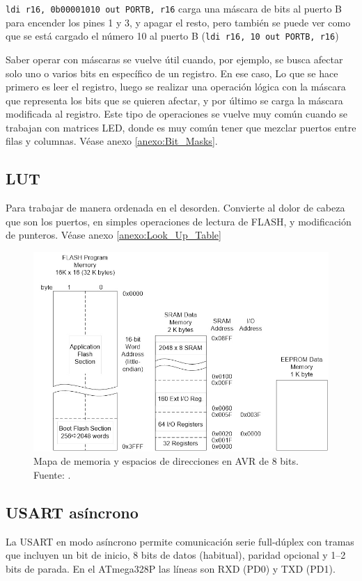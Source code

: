 \texttt{ldi r16, 0b00001010 out PORTB, r16} carga una máscara de bits al puerto B para encender los pines 1 y 3, y apagar el resto, pero también se puede ver como que se está cargado el número 10 al puerto B (\texttt{ldi r16, 10 out PORTB, r16})

Saber operar con máscaras se vuelve útil cuando, por ejemplo, se busca afectar solo uno o varios bits en específico de un registro. En ese caso,  Lo que se hace primero es leer el registro, luego se realizar una operación lógica con la máscara que representa los bits que se quieren afectar, y por último se carga la máscara modificada al registro. Este tipo de operaciones se vuelve muy común cuando se trabajan con matrices LED, donde es muy común tener que mezclar puertos entre filas y columnas. Véase anexo \ref{anexo:Bit_Masks}.


\subsection{LUT}
Para trabajar de manera ordenada en el desorden. Convierte al dolor de cabeza que son los puertos, en simples operaciones de lectura de FLASH, y modificación de punteros. Véase anexo \ref{anexo:Look_Up_Table}

\begin{figure}[H]
  \centering
  \includegraphics[width=\linewidth]{./Anexos/Memory Map.jpg}
  \caption{Mapa de memoria y espacios de direcciones en AVR de 8 bits. Fuente: \cite{arxterra_avr_addressing_modes}.}
  \label{fig:avr-memory-map}
\end{figure}

\subsection{USART asíncrono}
La USART en modo asíncrono permite comunicación serie full-dúplex con tramas que incluyen un bit de inicio, 8 bits de datos (habitual), paridad opcional y 1–2 bits de parada. En el ATmega328P las líneas son RXD (PD0) y TXD (PD1).

